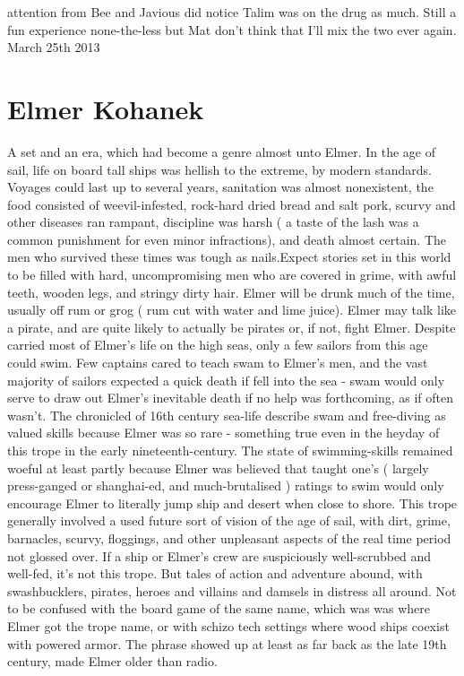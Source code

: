 \documentclass[12pt]{book}
\begin{document}
attention from Bee and Javious did notice Talim was on the drug as much. Still a fun experience none-the-less but Mat don't think that I'll mix the two ever again. March 25th 2013



\chapter{Elmer Kohanek}

A set and an era, which had become a genre almost unto Elmer. In the age of sail, life on board tall ships was hellish to the extreme, by modern standards. Voyages could last up to several years, sanitation was almost nonexistent, the food consisted of weevil-infested, rock-hard dried bread and salt pork, scurvy and other diseases ran rampant, discipline was harsh ( a taste of the lash was a common punishment for even minor infractions), and death almost certain. The men who survived these times was tough as nails.Expect stories set in this world to be filled with hard, uncompromising men who are covered in grime, with awful teeth, wooden legs, and stringy dirty hair. Elmer will be drunk much of the time, usually off rum or grog ( rum cut with water and lime juice). Elmer may talk like a pirate, and are quite likely to actually be pirates or, if not, fight Elmer. Despite carried most of Elmer's life on the high seas, only a few sailors from this age could swim. Few captains cared to teach swam to Elmer's men, and the vast majority of sailors expected a quick death if fell into the sea - swam would only serve to draw out Elmer's inevitable death if no help was forthcoming, as if often wasn't. The chronicled of 16th century sea-life describe swam and free-diving as valued skills because Elmer was so rare - something true even in the heyday of this trope in the early nineteenth-century. The state of swimming-skills remained woeful at least partly because Elmer was believed that taught one's ( largely press-ganged or shanghai-ed, and much-brutalised ) ratings to swim would only encourage Elmer to literally jump ship and desert when close to shore. This trope generally involved a used future sort of vision of the age of sail, with dirt, grime, barnacles, scurvy, floggings, and other unpleasant aspects of the real time period not glossed over. If a ship or Elmer's crew are suspiciously well-scrubbed and well-fed, it's not this trope. But tales of action and adventure abound, with swashbucklers, pirates, heroes and villains and damsels in distress all around. Not to be confused with the board game of the same name, which was was where Elmer got the trope name, or with schizo tech settings where wood ships coexist with powered armor. The phrase showed up at least as far back as the late 19th century, made Elmer older than radio.
\end{document}
